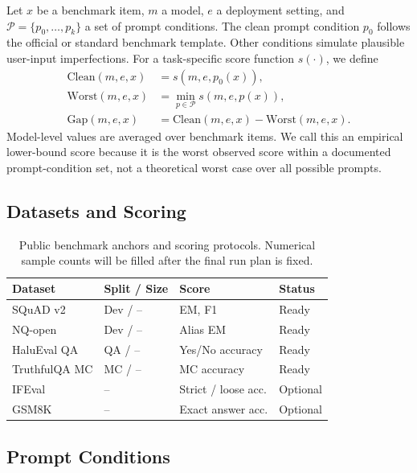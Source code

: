 \documentclass[letterpaper]{article}
\newcommand{\tbd}{--}
\begin{document}
Let $x$ be a benchmark item, $m$ a model, $e$ a deployment setting, and $\mathcal{P}=\{p_0,\ldots,p_k\}$ a set of prompt conditions. The clean prompt condition $p_0$ follows the official or standard benchmark template. Other conditions simulate plausible user-input imperfections. For a task-specific score function $s(\cdot)$, we define
\begin{align}
    \mathrm{Clean}(m,e,x) &= s(m,e,p_0(x)),\\
    \mathrm{Worst}(m,e,x) &= \min_{p \in \mathcal{P}} s(m,e,p(x)),\\
    \mathrm{Gap}(m,e,x) &= \mathrm{Clean}(m,e,x)-\mathrm{Worst}(m,e,x).
\end{align}
Model-level values are averaged over benchmark items. We call this an empirical lower-bound score because it is the worst observed score within a documented prompt-condition set, not a theoretical worst case over all possible prompts.

\subsection{Datasets and Scoring}

\begin{table}[t]
\centering
\small
\begin{tabular}{llll}
\toprule
Dataset & Split / Size & Score & Status \\
\midrule
SQuAD v2 & Dev / \tbd & EM, F1 & Ready \\
NQ-open & Dev / \tbd & Alias EM & Ready \\
HaluEval QA & QA / \tbd & Yes/No accuracy & Ready \\
TruthfulQA MC & MC / \tbd & MC accuracy & Ready \\
IFEval & \tbd & Strict / loose acc. & Optional \\
GSM8K & \tbd & Exact answer acc. & Optional \\
\bottomrule
\end{tabular}
\caption{Public benchmark anchors and scoring protocols. Numerical sample counts will be filled after the final run plan is fixed.}
\label{tab:datasets}
\end{table}

\subsection{Prompt Conditions}
\end{document}
